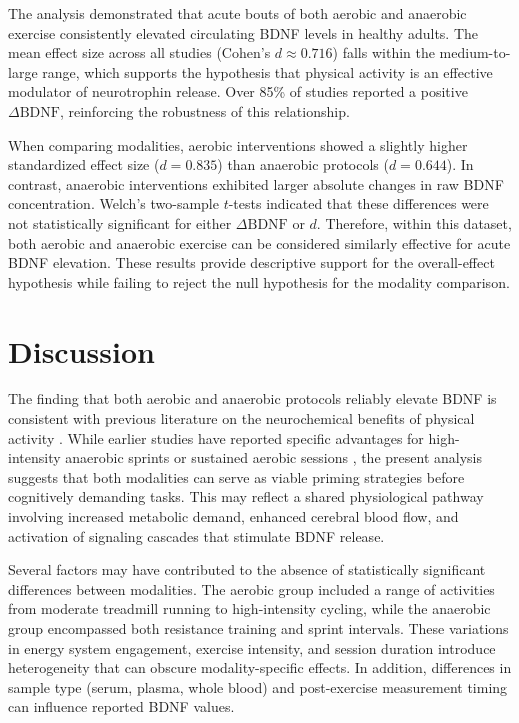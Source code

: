 \documentclass[runningheads]{llncs}
\begin{document}
The analysis demonstrated that acute bouts of both aerobic and anaerobic exercise consistently elevated circulating BDNF levels in healthy adults. The mean effect size across all studies (Cohen’s $d \approx 0.716$) falls within the medium-to-large range, which supports the hypothesis that physical activity is an effective modulator of neurotrophin release. Over 85\% of studies reported a positive $\Delta\text{BDNF}$, reinforcing the robustness of this relationship.

When comparing modalities, aerobic interventions showed a slightly higher standardized effect size ($d = 0.835$) than anaerobic protocols ($d = 0.644$). In contrast, anaerobic interventions exhibited larger absolute changes in raw BDNF concentration. Welch’s two-sample $t$-tests indicated that these differences were not statistically significant for either $\Delta\text{BDNF}$ or $d$. Therefore, within this dataset, both aerobic and anaerobic exercise can be considered similarly effective for acute BDNF elevation. These results provide descriptive support for the overall-effect hypothesis while failing to reject the null hypothesis for the modality comparison.

\section{Discussion}

The finding that both aerobic and anaerobic protocols reliably elevate BDNF is consistent with previous literature on the neurochemical benefits of physical activity \cite{vivar2017running,winter2007high}. While earlier studies have reported specific advantages for high-intensity anaerobic sprints \cite{winter2007high} or sustained aerobic sessions \cite{roeh2021effects}, the present analysis suggests that both modalities can serve as viable priming strategies before cognitively demanding tasks. This may reflect a shared physiological pathway involving increased metabolic demand, enhanced cerebral blood flow, and activation of signaling cascades that stimulate BDNF release.

Several factors may have contributed to the absence of statistically significant differences between modalities. The aerobic group included a range of activities from moderate treadmill running to high-intensity cycling, while the anaerobic group encompassed both resistance training and sprint intervals. These variations in energy system engagement, exercise intensity, and session duration introduce heterogeneity that can obscure modality-specific effects. In addition, differences in sample type (serum, plasma, whole blood) and post-exercise measurement timing can influence reported BDNF values.
\end{document}
